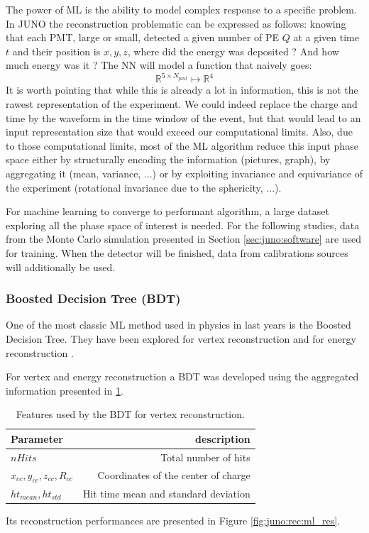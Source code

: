 \documentclass[../main.tex]{subfiles}
\begin{document}
The power of ML is the ability to model complex response to a specific problem. In JUNO the reconstruction problematic can be expressed as follows: knowing that each PMT, large or small, detected a given number of PE $Q$ at a given time $t$ and their position is $x,y,z$, where did the energy was deposited ? And how much energy was it ? The NN will model a function that naively goes:
\begin{equation}
    \mathbb{R}^{5 \times N_{pmt}} \longmapsto \mathbb{R}^4
\end{equation}
It is worth pointing that while this is already a lot in information, this is not the rawest representation of the experiment. We could indeed replace the charge and time by the waveform in the time window of the event, but that would lead to an input representation size that would exceed our computational limits. Also, due to those computational limits, most of the ML algorithm reduce this input phase space either by structurally encoding the information (pictures, graph), by aggregating it (mean, variance, ...) or by exploiting invariance and equivariance of the experiment (rotational invariance due to the sphericity, ...).

For machine learning to converge to performant algorithm, a large dataset exploring all the phase space of interest is needed. For the following studies, data from the Monte Carlo simulation presented in Section \ref{sec:juno:software} are used for training. When the detector will be finished, data from calibrations sources will additionally be used.

\subsubsection{Boosted Decision Tree (BDT)}

One of the most classic ML method used in physics in last years is the Boosted Decision Tree. They have been explored for vertex reconstruction \cite{qian_vertex_2021} and for energy reconstruction \cite{qian_vertex_2021, gavrikov_energy_2022}.

For vertex and energy reconstruction a BDT was developed using the aggregated information presented in \ref{tab:juno:rec:bdt_vertex}.

\begin{table}[ht]
  \centering
  \begin{tabular}{l|r}
    Parameter & description \\
    \hline
    $nHits$ & Total number of hits \\
    $x_{cc}, y_{cc}, z_{cc}, R_{cc}$ & Coordinates of the center of charge \\
    $ht_{mean}, ht_{std}$ & Hit time mean and standard deviation
  \end{tabular}
  \caption{Features used by the BDT for vertex reconstruction.}
  \label{tab:juno:rec:bdt_vertex}
\end{table}
Its reconstruction performances are presented in Figure \ref{fig:juno:rec:ml_res}.
\end{document}
